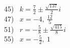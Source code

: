 \documentclass[12pt]{book}
\theoremstyle{definition}
\begin{document}
\begin{multicols}{3}
   45)~ $k=\frac{7}{2}\pm\frac{\sqrt{137}}{2}i$\\
   47)~ $x=-4,~\frac{12}{5}$\\
   51)~ $r=-\frac{5}{8}\pm\frac{\sqrt{415}}{8}i$\\
   55)~ $x=-\frac{5}{2},~1$\\
\end{multicols}
\end{document}
